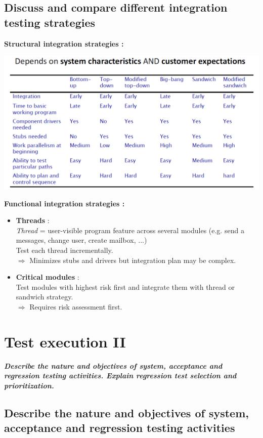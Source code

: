 \documentclass{article}
\begin{document}
\newpage
\subsection{Discuss and compare different integration testing strategies}

\textbf{Structural integration strategies :}
\begin{center}
    \includegraphics[scale=0.5]{56.PNG}
\end{center}
\textbf{Functional integration strategies :}
\begin{itemize}
    \item \textbf{Threads} : \\
    \textit{Thread} = user-visible program feature across several modules (e.g. send a messages, change user, create mailbox, ...)\\
    Test each thread incrementally.\\
    $\Rightarrow$ Minimizes stubs and drivers but integration plan may be complex.
    \item \textbf{Critical modules} : \\
    Test modules with highest risk first and integrate them with thread or sandwich strategy.\\
    $\Rightarrow$ Requires risk assessment first.\\
\end{itemize}

\newpage
\section{Test execution II}
\textbf{\textit{Describe the nature and objectives of system, acceptance and regression testing activities. Explain regression test selection and prioritization.}}

\subsection{Describe the nature and objectives of system, acceptance and regression testing activities}
\end{document}
